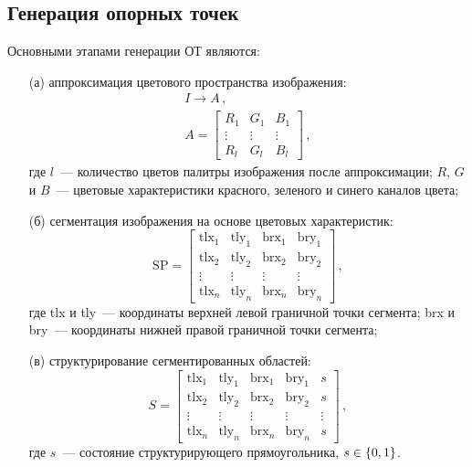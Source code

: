 \begin{multicols}{2}
\section{Генерация опорных точек}

  Основными этапами генерации ОТ являются:
  \begin{itemize}
  \item[(а)] аппроксимация цветового пространства изоб\-ра\-жения:
  \begin{gather*}
  I\to A\,,\\
  A=\begin{bmatrix}
  R_1 & G_1 & B_1\\
  \vdots & \vdots & \vdots\\
  R_l & G_l & B_l
  \end{bmatrix}\,,
  \end{gather*}
где $l$~--- количество цветов палитры изображения после аппроксимации;
$R$, $G$ и $B$~--- цветовые характеристики красного, зеленого и синего 
каналов цвета;
  \item[(б)] сегментация изображения на основе цветовых характеристик:
  $$
\mathrm{SP}=\begin{bmatrix}
  \mathrm{tlx}_1 & \mathrm{tly}_1 & \mathrm{brx}_1 & \mathrm{bry}_1\\
  \mathrm{tlx}_2 & \mathrm{tly}_2 & \mathrm{brx}_2 & \mathrm{bry}_2\\
  \vdots &\vdots &\vdots & \vdots\\
  \mathrm{tlx}_n & \mathrm{tly}_n & \mathrm{brx}_n & \mathrm{bry}_n
  \end{bmatrix}\,,
  $$
где tlx и tly~--- координаты верхней левой граничной точки сегмента;
brx и bry~--- координаты нижней правой граничной точки сегмента;
  \item[(в)] структурирование сегментированных областей:
  $$
  S=\begin{bmatrix}
  \mathrm{tlx}_1 & \mathrm{tly}_1 & \mathrm{brx}_1 & \mathrm{bry}_1 & s\\
  \mathrm{tlx}_2 & \mathrm{tly}_2 & \mathrm{brx}_2 & \mathrm{bry}_2 & s\\
  \vdots & \vdots & \vdots & \vdots &\vdots\\
  \mathrm{tlx}_n & \mathrm{tly}_n & \mathrm{brx}_n & \mathrm{bry}_n & s
  \end{bmatrix}\,,
  $$
где $s$~--- состояние структурирующего прямоугольника, $s\hm\in \{0, 1\}$.
  \end{itemize}
  

\end{multicols}
